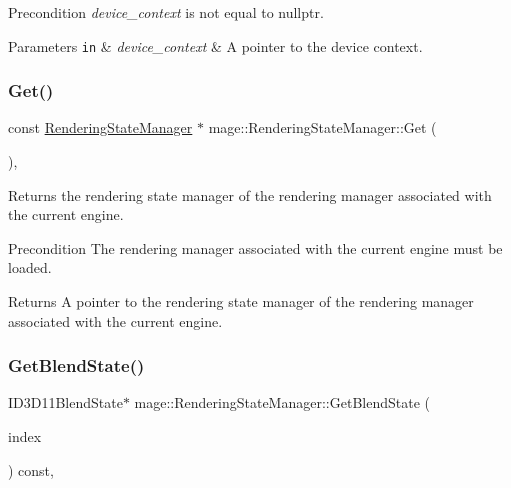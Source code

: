 \begin{DoxyPrecond}{Precondition}
{\itshape device\+\_\+context} is not equal to {\ttfamily nullptr}. 
\end{DoxyPrecond}

\begin{DoxyParams}[1]{Parameters}
\mbox{\tt in}  & {\em device\+\_\+context} & A pointer to the device context. \\
\hline
\end{DoxyParams}
\hypertarget{classmage_1_1_rendering_state_manager_aeea3332b821a6519e81ae7de1cbafecb}{}\label{classmage_1_1_rendering_state_manager_aeea3332b821a6519e81ae7de1cbafecb} 
\subsubsection{\texorpdfstring{Get()}{Get()}}
{\footnotesize\ttfamily const \hyperlink{classmage_1_1_rendering_state_manager}{Rendering\+State\+Manager} $\ast$ mage\+::\+Rendering\+State\+Manager\+::\+Get (\begin{DoxyParamCaption}{ }\end{DoxyParamCaption})\hspace{0.3cm}{\ttfamily [static]}, {\ttfamily [noexcept]}}

Returns the rendering state manager of the rendering manager associated with the current engine.

\begin{DoxyPrecond}{Precondition}
The rendering manager associated with the current engine must be loaded. 
\end{DoxyPrecond}
\begin{DoxyReturn}{Returns}
A pointer to the rendering state manager of the rendering manager associated with the current engine. 
\end{DoxyReturn}
\hypertarget{classmage_1_1_rendering_state_manager_a09dc8e15d98269b1b9c5f9bb71c647b4}{}\label{classmage_1_1_rendering_state_manager_a09dc8e15d98269b1b9c5f9bb71c647b4} 
\subsubsection{\texorpdfstring{Get\+Blend\+State()}{GetBlendState()}}
{\footnotesize\ttfamily I\+D3\+D11\+Blend\+State$\ast$ mage\+::\+Rendering\+State\+Manager\+::\+Get\+Blend\+State (\begin{DoxyParamCaption}\item[{\hyperlink{classmage_1_1_rendering_state_manager_a499a47606ff73352331177b668c4b64c}{Blend\+State\+Index}}]{index }\end{DoxyParamCaption}) const\hspace{0.3cm}{\ttfamily [private]}, {\ttfamily [noexcept]}}

